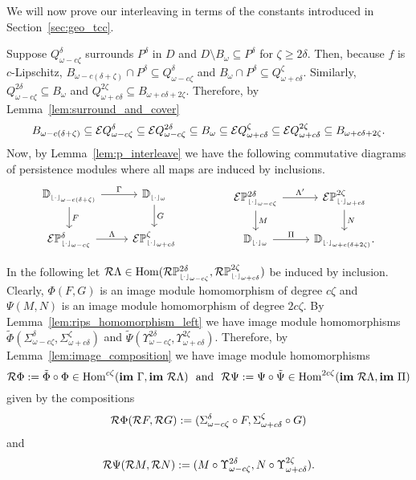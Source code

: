 
We will now prove our interleaving in terms of the constants introduced in Section~\ref{sec:geo_tcc}.

Suppose $Q_{\omega-c\zeta}^\delta$ surrounds $P^\delta$ in $D$ and $D\setminus B_\omega\subseteq P^\delta$ for $\zeta\geq 2\delta$.
Then, because $f$ is $c$-Lipschitz, $B_{\omega-c(\delta+\zeta)}\cap P^\delta\subseteq Q_{\omega-c\zeta}^\delta$ and $B_\omega\cap P^\delta\subseteq Q_{\omega+c\delta}^\zeta$.
Similarly, $Q_{\omega-c\zeta}^{2\delta}\subseteq B_\omega$ and $Q_{\omega+c\delta}^{2\zeta}\subseteq B_{\omega+c{\delta+2\zeta}}$.
Therefore, by Lemma~\ref{lem:surround_and_cover}
\[ B_{\omega-c(\delta+\zeta)}\subseteq \mathcal{E} Q_{\omega-c\zeta}^\delta\subseteq\mathcal{E} Q_{\omega-c\zeta}^{2\delta}\subseteq B_\omega
  \subseteq \mathcal{E} Q_{\omega+c\delta}^\zeta\subseteq \mathcal{E} Q_{\omega+c\delta}^{2\zeta}\subseteq B_{\omega+c{\delta+2\zeta}}.\]
%
Now, by Lemma~\ref{lem:p_interleave} we have the following commutative diagrams of persistence modules where all maps are induced by inclusions.
\[\begin{tikzcd}
    \DD{\omega-c(\delta+\zeta)} \arrow{r}{\Gamma}\arrow{d}{F} &
    \DD{\omega} \arrow{d}{G}\\
    \E\PP{\omega-c\zeta}{\delta}\arrow{r}{\Lambda} &
    \E\PP{\omega+c\delta}{\zeta}
  \end{tikzcd}\hspace{10ex}
  \begin{tikzcd}
    \E\PP{\omega-c\zeta}{2\delta} \arrow{r}{\Lambda'}\arrow{d}{M} &
    \E\PP{\omega+c\delta}{2\zeta}\arrow{d}{N}\\
    \DD{\omega} \arrow{r}{\Pi} &
    \DD{\omega+c(\delta+2\zeta)}.
  \end{tikzcd}\]

In the following let $\mathcal{R}\Lambda\in\mathrm{Hom}(\mathcal{R}\mathbb{P}_{\scriptscriptstyle \lfloor\cdot\rfloor_{\omega-c\zeta}}^{2\delta},\mathcal{R}\mathbb{P}_{\scriptscriptstyle \lfloor\cdot\rfloor_{\omega+c\delta}}^{2\zeta})$ be induced by inclusion.
Clearly, $\Phi(F, G)$ is an image module homomorphism of degree $c\zeta$ and $\Psi(M, N)$ is an image module homomorphism of degree $2c\zeta$.
By Lemma~\ref{lem:rips_homomorphism_left} we have image module homomorphisms $\tilde{\Phi}(\Sigma_{\omega-c\zeta}^\delta, \Sigma_{\omega+c\delta}^\zeta)$ and $\tilde{\Psi}(\Upsilon_{\omega-c\zeta}^{2\delta}, \Upsilon_{\omega+c\delta}^{2\zeta})$.
Therefore, by Lemma~\ref{lem:image_composition} we have image module homomorphisms
\[ \mathcal{R}\Phi := \tilde{\Phi}\circ\Phi\in\mathrm{Hom}^{c\zeta}(\mathbf{im}~\Gamma,\mathbf{im}~\mathcal{R}\Lambda)\ \text{ and }\ \mathcal{R}\Psi :=\Psi\circ\tilde{\Psi}\in\mathrm{Hom}^{2c\zeta}(\mathbf{im}~\mathcal{R}\Lambda, \mathbf{im}~\Pi)\] given by the compositions
\[ \mathcal{R}\Phi(\mathcal{R} F, \mathcal{R} G) := (\Sigma_{\omega-c\zeta}^\delta\circ F, \Sigma_{\omega+c\delta}^\zeta\circ G)\]
and
\[ \mathcal{R}\Psi(\mathcal{R} M, \mathcal{R} N) := (M\circ \Upsilon_{\omega-c\zeta}^{2\delta}, N\circ\Upsilon_{\omega+c\delta}^{2\zeta}).\]

